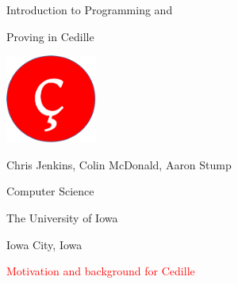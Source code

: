 \documentclass[11pt]{beamer}
\date{\ }
\begin{document}

\begin{frame}

\begin{center}
{\huge
  Introduction to Programming and

\vspace{.1cm}

  Proving in Cedille }

\vspace{.75cm}

\includegraphics[width=3cm]{logo}


\vspace{.6cm}

Chris Jenkins, Colin McDonald, Aaron Stump

{\small
Computer Science 

The University of Iowa

Iowa City, Iowa
}

\end{center}
\end{frame}

\newcommand{\grun}[1]{\textcolor{dgreen}{\underline{#1}}}




\begin{frame}
\begin{center}
  \Huge
  \qlogo{1.8
    cm}

  \vspace{1cm}

{\Large
  \textcolor{red}{Motivation and background for Cedille}
}
  \end{center}

\end{frame}
\end{document}
